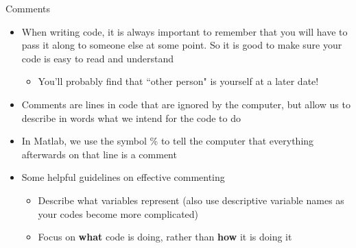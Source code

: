 {}\documentclass[letterpaper,
compress,
xcolor=x11names,
]{beamer}
\begin{document}
\begin{frame}{Comments}
	\footnotesize
	\begin{itemize}
		\item When writing code, it is always important to remember that you will have to pass it along to someone else at some point. So it is good to make sure your code is easy to read and understand
		\begin{itemize}
			\item You'll probably find that ``other person" is yourself at a later date!
		\end{itemize}
		\item Comments are lines in code that are ignored by the computer, but allow us to describe in words what we intend for the code to do
		\item In Matlab, we use the symbol \% to tell the computer that everything afterwards on that line is a comment
		\item Some helpful guidelines on effective commenting
		\begin{itemize}
			\item Describe what variables represent (also use descriptive variable names as your codes become more complicated)
			\item Focus on \textbf{what} code is doing, rather than \textbf{how} it is doing it
		\end{itemize}
	\end{itemize}
\end{frame}
\end{document}
